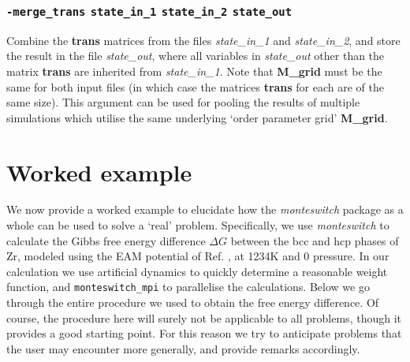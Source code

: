 \documentclass{report}
\begin{document}
\subsection{\texttt{-merge\_trans} \texttt{state\_in\_1}  \texttt{state\_in\_2} \texttt{state\_out}}
Combine the \textbf{trans} matrices from the files \emph{state\_in\_1} and \emph{state\_in\_2}, and store the result in the 
file \emph{state\_out}, where all variables in \emph{state\_out} other than the matrix \textbf{trans} are inherited from 
\emph{state\_in\_1}. Note that \textbf{M\_grid} must be the same for both input files (in which case the matrices \textbf{trans} for
each are of the same size). This argument can be used for pooling the results of multiple simulations which utilise the same underlying
`order parameter grid' \textbf{M\_grid}.


\chapter{Worked example}\label{chapter:example}
We now provide a worked example to elucidate how the \emph{monteswitch} package as a whole can be used to solve a `real' problem.
Specifically, we use \emph{monteswitch} to calculate the Gibbs free energy difference $\Delta G$ between the bcc and hcp
phases of Zr, modeled using the EAM potential of Ref. \cite{Mendelev_2007}, at 1234K and 0 pressure. 
In our calculation we use artificial dynamics to quickly determine a reasonable weight function, and \texttt{monteswitch\_mpi} to
parallelise the calculations. Below we go through the entire procedure we used to obtain the free energy
difference. Of course, the procedure here will surely not be applicable to all problems, though it provides a good starting point. 
For this reason we try to anticipate problems that the user may encounter more generally, and provide remarks accordingly.
\end{document}

